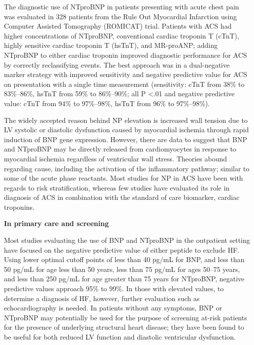 \documentclass[14pt,a4paper,onecolumn]{extarticle}
\begin{document}
The diagnostic use of NTproBNP in patients presenting with acute chest pain was evaluated in 328 patients from the Rule Out Myocardial Infarction using Computer Assisted Tomography (ROMICAT) trial. Patients with ACS had higher concentrations of NTproBNP, conventional cardiac troponin T (cTnT), highly sensitive cardiac troponin T (hsTnT), and MR-proANP; adding NTproBNP to either cardiac troponin improved diagnostic performance for ACS by correctly reclassifying events. The best approach was in a dual-negative marker strategy with improved sensitivity and negative predictive value for ACS on presentation with a single time measurement (sensitivity: cTnT from 38\% to 83\%–86\%, hsTnT from 59\% to 86\%–90\%; all P <.01 and negative predictive value: cTnT from 94\% to 97\%–98\%, hsTnT from 96\% to 97\%–98\%). \citep{Troung2012}

The widely accepted reason behind NP elevation is increased wall tension due to LV systolic or diastolic dysfunction caused by myocardial ischemia through rapid induction of BNP gene expression. However, there are data to suggest that BNP and NTproBNP may be directly released from cardiomyocytes in response to myocardial ischemia regardless of ventricular wall stress. Theories abound regarding cause, including the activation of the inflammatory pathway; similar to some of the acute phase reactants.  Most studies for NP in ACS have been with regards to risk stratification, whereas few studies have evaluated its role in diagnosis of ACS in combination with the standard of care biomarker, cardiac troponins. \citep{Gaggin2014}


\textbf{In primary care and screening}

Most studies evaluating the use of BNP and NTproBNP in the outpatient setting have focused on the negative predictive value of either peptide to exclude HF. Using lower optimal cutoff points of less than 40 pg/mL for BNP, and less than 50 pg/mL for age less than 50 years, less than 75 pg/mL for ages 50–75 years, and less than 250 pg/mL for age greater than 75 years for NTproBNP, negative predictive values approach 95\% to 99\%. In those with elevated values, to determine a diagnosis of HF, however, further evaluation such as echocardiography is needed. In patients without any symptoms, BNP or NTproBNP may potentially be used for the purpose of screening at-risk patients for the presence of underlying structural heart disease; they have been found to be useful for both reduced LV function and diastolic ventricular dysfunction. \citep{Gaggin2014}
\end{document}
